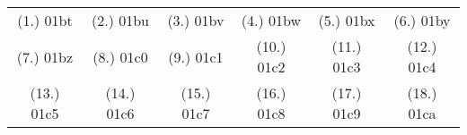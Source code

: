 \begin{eocexercises}{}
\par \practiceinfo
\par \begin{tabular}[h]{cccccc}
(1.)	01bt	&
(2.)	01bu	&
(3.)	01bv	&
(4.)	01bw	&
(5.)	01bx	&
(6.)	01by	\\ %
(7.)	01bz	&
(8.)	01c0	&
(9.)	01c1	&
(10.)	01c2	&
(11.)	01c3	&
(12.)	01c4	\\ %
(13.)	01c5	&
(14.)	01c6	&
(15.)	01c7	&
(16.)	01c8	&
(17.)	01c9	&
(18.)	01ca	\\ %
\end{tabular}
\end{eocexercises}
